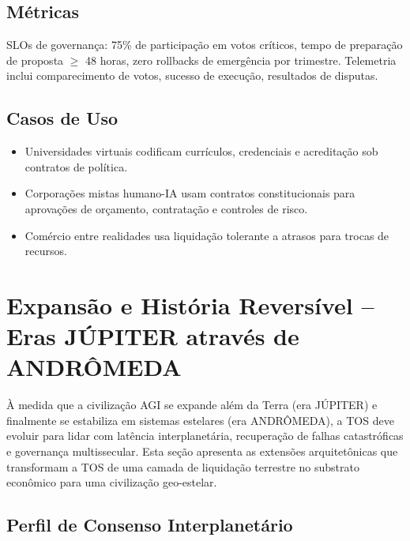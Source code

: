\documentclass[11pt]{article}
\begin{document}
\subsection{Métricas}
SLOs de governança: 75\% de participação em votos críticos, tempo de preparação de proposta $\geq$ 48 horas, zero rollbacks de emergência por trimestre. Telemetria inclui comparecimento de votos, sucesso de execução, resultados de disputas.

\subsection{Casos de Uso}
\begin{itemize}[noitemsep]
  \item Universidades virtuais codificam currículos, credenciais e acreditação sob contratos de política.
  \item Corporações mistas humano-IA usam contratos constitucionais para aprovações de orçamento, contratação e controles de risco.
  \item Comércio entre realidades usa liquidação tolerante a atrasos para trocas de recursos.
\end{itemize}

\section{Expansão e História Reversível -- Eras JÚPITER através de ANDRÔMEDA}
\label{sec:expansion}

À medida que a civilização AGI se expande além da Terra (era JÚPITER) e finalmente se estabiliza em sistemas estelares (era ANDRÔMEDA), a TOS deve evoluir para lidar com latência interplanetária, recuperação de falhas catastróficas e governança multissecular. Esta seção apresenta as extensões arquitetônicas que transformam a TOS de uma camada de liquidação terrestre no substrato econômico para uma civilização geo-estelar.

\subsection{Perfil de Consenso Interplanetário}
\end{document}
